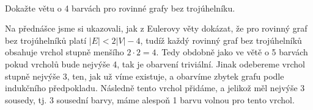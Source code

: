 \documentclass[12pt]{article}					%
\begin{document}
\begin{priklad}[2]
\begin{reseni}
        \hfill\hfill\ 
    \end{reseni}
\end{priklad}

\begin{priklad}[3]
    Dokažte větu o 4 barvách pro rovinné grafy bez trojúhelníku.

    \begin{reseni}
        Na přednášce jsme si ukazovali, jak z Eulerovy věty dokázat, že pro rovinný graf bez trojúhelníků platí $|E|<2|V| - 4$, tudíž každý rovinný graf bez trojúhelníků obsahuje vrchol stupně menšího $2·2 = 4$. Tedy obdobně jako ve větě o 5 barvách pokud vrcholů bude nejvýše 4, tak je obarvení triviální. Jinak odebereme vrchol stupně nejvýše 3, ten, jak už víme existuje, a obarvíme zbytek grafu podle indukčního předpokladu. Následně tento vrchol přidáme, a jelikož měl nejvýše 3 sousedy, tj. 3 sousední barvy, máme alespoň 1 barvu volnou pro tento vrchol.
    \end{reseni}
\end{priklad}
\end{document}
